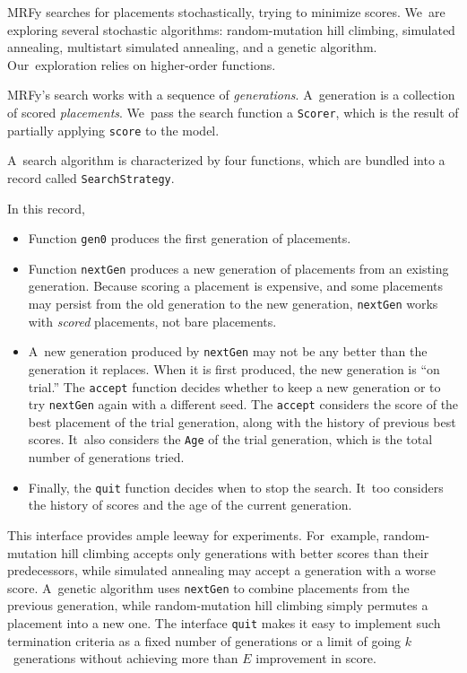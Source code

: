 \documentclass[preprint,nonatbib,blockstyle,nocopyrightspace,times]{sigplanconf}
\newcommand\smallverbatiminput[1]{{\par\unskip\small}}
\newcommand\smallfuzzverbatiminput[2]{{\par\unskip\small\hfuzz=#1 }}
\begin{document}
MRFy searches for placements stochastically,
trying to minimize scores.
We~are exploring several stochastic algorithms: random-mutation hill
climbing, simulated  
annealing, multistart simulated annealing, and a genetic algorithm.
Our~exploration relies on higher-order functions.

MRFy's search works with a sequence of \emph{generations}.
A~generation is a collection of scored \emph{placements}.
We~pass the
search function a \texttt{Scorer}, which is the result of partially
applying \texttt{score} to the model.
\smallverbatiminput{scoredecl}
A~search algorithm is characterized by four functions, which are
bundled into a record called \texttt{SearchStrategy}.
\smallfuzzverbatiminput{2.3pt}{strategy}
In this record,
\begin{itemize}
\item
Function \texttt{gen0} produces the first generation of placements.
\item
Function \texttt{nextGen} produces a new generation of placements from
an existing generation.
Because scoring a placement is expensive, 
and some placements may persist from the old generation to the new
generation, \texttt{nextGen} works with \emph{scored} placements, not
bare placements.
\item
A~new generation produced by \texttt{nextGen} may not be any better
than the generation it replaces.
When it is first produced, the new generation is ``on trial.''
The \texttt{accept} function decides whether to keep a new generation
or to try \texttt{nextGen} again with a different seed.
The \texttt{accept} considers the score of the best
placement of the trial generation, along with the history of previous
best scores.
It~also considers the \texttt{Age} of the trial generation, which is
the total number of 
generations tried.
\item
Finally, the \texttt{quit} function decides when to stop the search.
It~too considers the history of scores and the age of the current
generation. 
\end{itemize}
This interface provides ample leeway for experiments.
For~example, random-mutation hill climbing accepts only generations
with better scores than their predecessors,
while simulated annealing may accept a generation with a worse score.
A~genetic algorithm uses \texttt{nextGen} to
combine placements from the previous generation, while
random-mutation
hill climbing simply permutes a placement into a new one.
The interface \texttt{quit} makes it easy
to implement such termination criteria as a fixed number of generations
or a limit of going $k$~generations without achieving more than $E$
improvement in score. 
\end{document}
